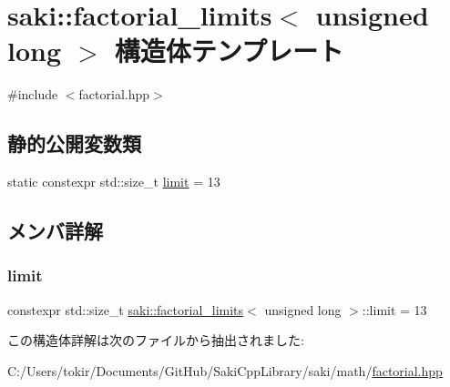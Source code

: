 \hypertarget{structsaki_1_1factorial__limits_3_01unsigned_01long_01_4}{}\section{saki\+:\+:factorial\+\_\+limits$<$ unsigned long $>$ 構造体テンプレート}
\label{structsaki_1_1factorial__limits_3_01unsigned_01long_01_4}


{\ttfamily \#include $<$factorial.\+hpp$>$}

\subsection*{静的公開変数類}
\begin{DoxyCompactItemize}
\item 
static constexpr std\+::size\+\_\+t \mbox{\hyperlink{structsaki_1_1factorial__limits_3_01unsigned_01long_01_4_a07495a6d1ae52525df0610717b1a63e3}{limit}} = 13
\end{DoxyCompactItemize}


\subsection{メンバ詳解}
\mbox{\label{structsaki_1_1factorial__limits_3_01unsigned_01long_01_4_a07495a6d1ae52525df0610717b1a63e3}} 
\subsubsection{\texorpdfstring{limit}{limit}}
{\footnotesize\ttfamily constexpr std\+::size\+\_\+t \mbox{\hyperlink{structsaki_1_1factorial__limits}{saki\+::factorial\+\_\+limits}}$<$ unsigned long $>$\+::limit = 13\hspace{0.3cm}{\ttfamily [static]}}



この構造体詳解は次のファイルから抽出されました\+:\begin{DoxyCompactItemize}
\item 
C\+:/\+Users/tokir/\+Documents/\+Git\+Hub/\+Saki\+Cpp\+Library/saki/math/\mbox{\hyperlink{factorial_8hpp}{factorial.\+hpp}}\end{DoxyCompactItemize}
